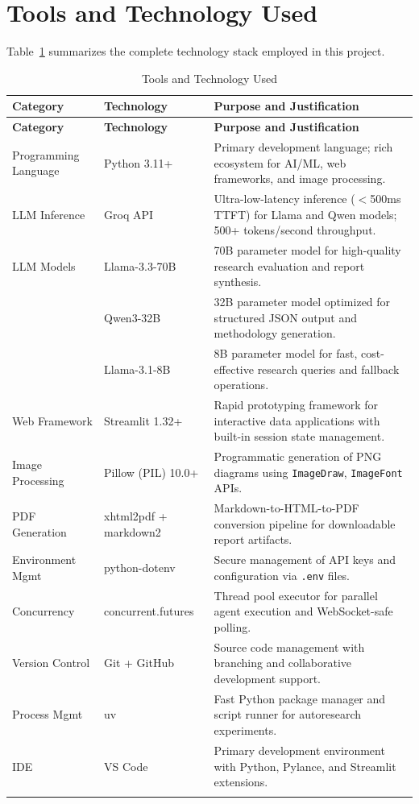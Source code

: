 \documentclass[a4paper,12pt,openany]{report}
\begin{document}
\section{Tools and Technology Used}

Table~\ref{tab:tools} summarizes the complete technology stack employed in this project.

\begin{longtable}{|p{2.8cm}|p{2.8cm}|p{8cm}|}
\hline
\textbf{Category} & \textbf{Technology} & \textbf{Purpose and Justification} \\
\hline
\endfirsthead
\hline
\textbf{Category} & \textbf{Technology} & \textbf{Purpose and Justification} \\
\hline
\endhead
\hline
\endfoot
Programming Language & Python 3.11+ & Primary development language; rich ecosystem for AI/ML, web frameworks, and image processing. \\
\hline
LLM Inference & Groq API & Ultra-low-latency inference ($<$500ms TTFT) for Llama and Qwen models; 500+ tokens/second throughput. \\
\hline
LLM Models & Llama-3.3-70B & 70B parameter model for high-quality research evaluation and report synthesis. \\
\hline
 & Qwen3-32B & 32B parameter model optimized for structured JSON output and methodology generation. \\
\hline
 & Llama-3.1-8B & 8B parameter model for fast, cost-effective research queries and fallback operations. \\
\hline
Web Framework & Streamlit 1.32+ & Rapid prototyping framework for interactive data applications with built-in session state management. \\
\hline
Image Processing & Pillow (PIL) 10.0+ & Programmatic generation of PNG diagrams using \texttt{ImageDraw}, \texttt{ImageFont} APIs. \\
\hline
PDF Generation & xhtml2pdf + markdown2 & Markdown-to-HTML-to-PDF conversion pipeline for downloadable report artifacts. \\
\hline
Environment Mgmt & python-dotenv & Secure management of API keys and configuration via \texttt{.env} files. \\
\hline
Concurrency & concurrent.futures & Thread pool executor for parallel agent execution and WebSocket-safe polling. \\
\hline
Version Control & Git + GitHub & Source code management with branching and collaborative development support. \\
\hline
Process Mgmt & uv & Fast Python package manager and script runner for autoresearch experiments. \\
\hline
IDE & VS Code & Primary development environment with Python, Pylance, and Streamlit extensions. \\
\hline

\caption{Tools and Technology Used}
\label{tab:tools}
\end{longtable}
\end{document}
